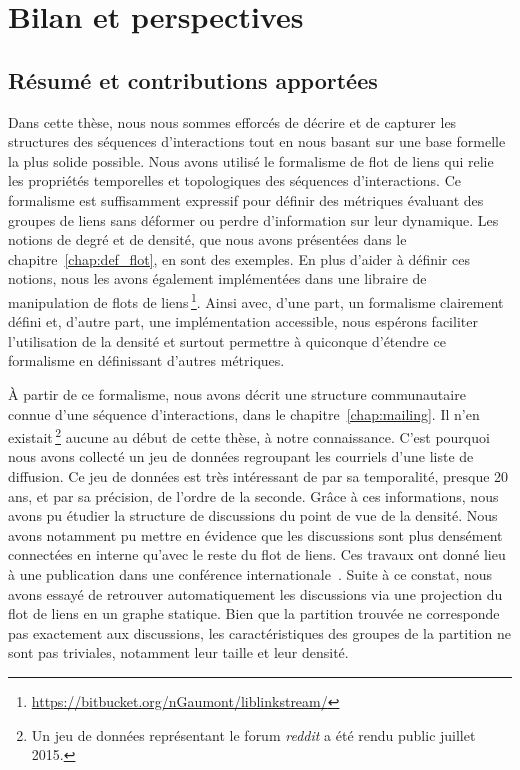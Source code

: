 \chapter{Bilan et perspectives}
\label{Conclusion}

\section{Résumé et contributions apportées}

Dans cette thèse, nous nous sommes efforcés de décrire et de capturer les structures des séquences d'interactions tout en nous basant sur une base formelle la plus solide possible.
Nous avons utilisé le formalisme de flot de liens qui relie les propriétés temporelles et topologiques des séquences d'interactions.
Ce formalisme est suffisamment expressif pour définir des métriques évaluant des groupes de liens sans déformer ou perdre d'information sur leur dynamique.
Les notions de degré et de densité, que nous avons présentées dans le chapitre~\ref{chap:def_flot}, en sont des exemples.
En plus d'aider à définir ces notions, nous les avons également implémentées dans une libraire de manipulation de flots de liens\,\footnote{\url{https://bitbucket.org/nGaumont/liblinkstream/}}.
Ainsi avec, d'une part, un formalisme clairement défini et, d'autre part, une implémentation accessible, nous espérons faciliter l'utilisation de la densité et surtout permettre à quiconque d'étendre ce formalisme en définissant d'autres métriques.

\`A partir de ce formalisme, nous avons décrit une structure communautaire connue d'une séquence d'interactions, dans le chapitre~\ref{chap:mailing}.
Il n'en existait\,\footnote{Un jeu de données représentant le forum \emph{reddit} a été rendu public juillet 2015.} aucune au début de cette thèse, à notre connaissance.
C'est pourquoi nous avons collecté un jeu de données regroupant les courriels d'une liste de diffusion.
Ce jeu de données est très intéressant de par sa temporalité, presque 20 ans, et par sa précision, de l'ordre de la seconde.
Grâce à ces informations, nous avons pu étudier la structure de discussions du point de vue de la densité.
Nous avons notamment pu mettre en évidence que les discussions sont plus densément connectées en interne qu'avec le reste du flot de liens.
Ces travaux ont donné lieu à une publication dans une conférence internationale~\cite{Gaumont2016}.
Suite à ce constat, nous avons essayé de retrouver automatiquement les discussions via une projection du flot de liens en un graphe statique.
Bien que la partition trouvée ne corresponde pas exactement aux discussions, les caractéristiques des groupes de la partition ne sont pas triviales, notamment leur taille et leur densité.


